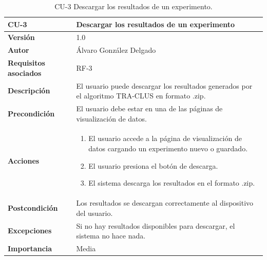 \begin{table}[p]
	\centering
	\begin{tabularx}{\linewidth}{ p{} p{} }
		\toprule
		\textbf{CU-3}    & \textbf{Descargar los resultados de un experimento} \\
		\toprule
		\textbf{Versión}              & 1.0    \\
		\textbf{Autor}                & Álvaro González Delgado \\
		\textbf{Requisitos asociados} & RF-3 \\
		\textbf{Descripción}          & El usuario puede descargar los resultados generados por el algoritmo TRA-CLUS en formato .zip. \\
		\textbf{Precondición}         & El usuario debe estar en una de las páginas de visualización de datos. \\
		\textbf{Acciones}             &
		\begin{enumerate}
			\item El usuario accede a la página de visualización de datos cargando un experimento nuevo o guardado.
			\item El usuario presiona el botón de descarga.
			\item El sistema descarga los resultados en el formato .zip.
		\end{enumerate} \\
		\textbf{Postcondición}        & Los resultados se descargan correctamente al dispositivo del usuario. \\
		\textbf{Excepciones}          & Si no hay resultados disponibles para descargar, el sistema no hace nada. \\
		\textbf{Importancia}          & Media \\
		\bottomrule
	\end{tabularx}
	\caption{CU-3 Descargar los resultados de un experimento.}
\end{table}

\FloatBarrier

